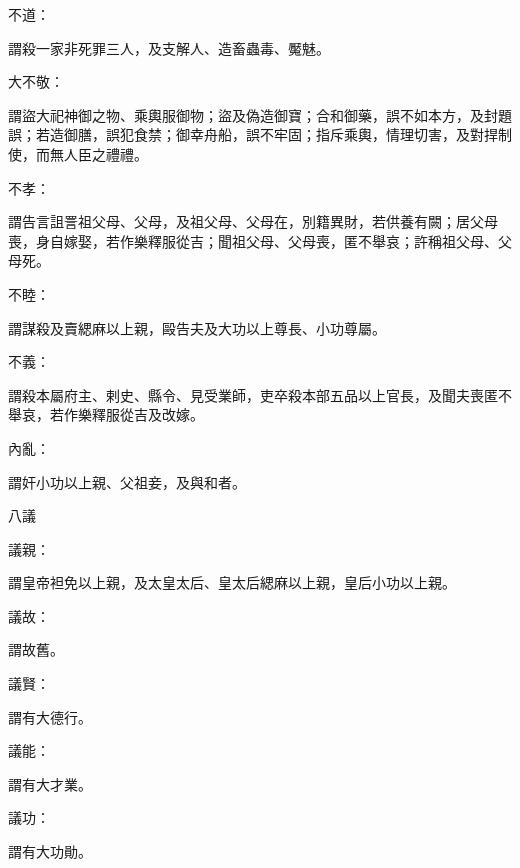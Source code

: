 \begin{pinyinscope}
 不道：



 謂殺一家非死罪三人，及支解人、造畜蟲毒、魘魅。



 大不敬：



 謂盜大祀神御之物、乘輿服御物；盜及偽造御寶；合和御藥，誤不如本方，及封題誤；若造御膳，誤犯食禁；御幸舟船，誤不牢固；指斥乘輿，情理切害，及對捍制使，而無人臣之禮禮。



 不孝：



 謂告言詛詈祖父母、父母，及祖父母、父母在，別籍異財，若供養有闕；居父母喪，身自嫁娶，若作樂釋服從吉；聞祖父母、父母喪，匿不舉哀；許稱祖父母、父母死。



 不睦：



 謂謀殺及賣緦麻以上親，毆告夫及大功以上尊長、小功尊屬。



 不義：



 謂殺本屬府主、剌史、縣令、見受業師，吏卒殺本部五品以上官長，及聞夫喪匿不舉哀，若作樂釋服從吉及改嫁。



 內亂：



 謂奸小功以上親、父祖妾，及與和者。



 八議



 議親：



 謂皇帝袒免以上親，及太皇太后、皇太后緦麻以上親，皇后小功以上親。



 議故：



 謂故舊。



 議賢：



 謂有大德行。



 議能：



 謂有大才業。



 議功：



 謂有大功勛。




\end{pinyinscope}
